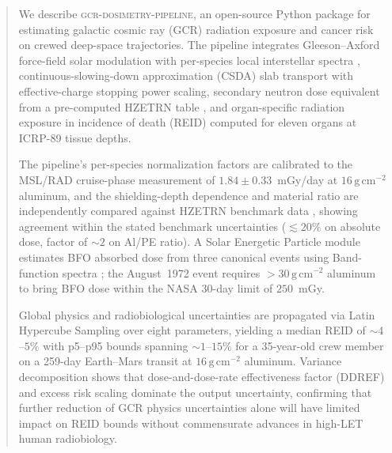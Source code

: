 
\begin{abstract}

We describe \textsc{gcr-dosimetry-pipeline}, an open-source Python package for
estimating galactic cosmic ray (GCR) radiation exposure and cancer risk on
crewed deep-space trajectories.
The pipeline integrates Gleeson--Axford force-field solar modulation
\citep{gleeson1968} with per-species local interstellar spectra
\citep{vos2015, boschini2020},
continuous-slowing-down approximation (CSDA) slab transport with
effective-charge stopping power scaling, secondary neutron dose equivalent
from a pre-computed HZETRN table \citep{slaba2014},
and organ-specific radiation exposure in incidence of death (REID)
\citep{cucinotta2013} computed for eleven organs at ICRP-89 tissue depths.

The pipeline's per-species normalization factors are calibrated to the
MSL/RAD cruise-phase measurement of $1.84 \pm 0.33$~mGy/day
\citep{zeitlin2013} at $16\,\mathrm{g\,cm^{-2}}$ aluminum, and the
shielding-depth dependence and material ratio are independently compared
against HZETRN benchmark data \citep{slaba2014, mrigakshi2013},
showing agreement within the stated benchmark uncertainties
($\lesssim 20\%$ on absolute dose, factor of $\sim\!2$ on Al/PE ratio).
A Solar Energetic Particle module estimates BFO absorbed dose from three
canonical events using Band-function spectra \citep{tylka2006};
the August~1972 event requires $>30\,\mathrm{g\,cm^{-2}}$ aluminum
to bring BFO dose within the NASA 30-day limit of $250$~mGy.

Global physics and radiobiological uncertainties are propagated via Latin
Hypercube Sampling over eight parameters, yielding a median REID of
$\sim\!4$--$5\%$ with p5--p95 bounds spanning $\sim\!1$--$15\%$ for a
35-year-old crew member on a 259-day Earth--Mars transit at
$16\,\mathrm{g\,cm^{-2}}$ aluminum.
Variance decomposition shows that dose-and-dose-rate effectiveness factor
(DDREF) and excess risk scaling dominate the output uncertainty,
confirming that further reduction of GCR physics uncertainties alone
will have limited impact on REID bounds without commensurate advances
in high-LET human radiobiology.


\end{abstract}
